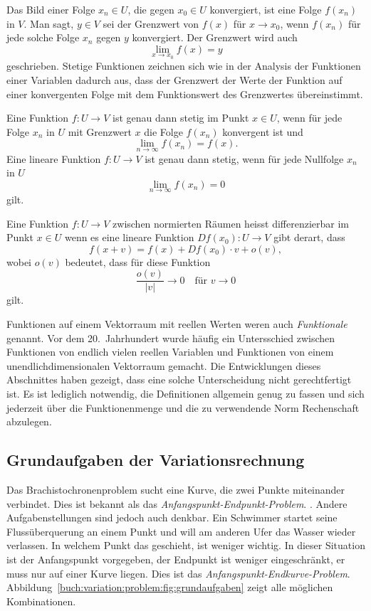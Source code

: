 Das Bild einer Folge $x_n\in U$, die gegen $x_0\in U$ konvergiert,
ist eine Folge $f(x_n)$ in $V$.
Man sagt, $y\in V$ sei der Grenzwert von $f(x)$ für $x\to x_0$,
wenn $f(x_n)$ für jede solche Folge $x_n$ gegen $y$ konvergiert.
Der Grenzwert wird auch
\[
\lim_{x\to x_0} f(x)
=
y
\]
geschrieben.
Stetige Funktionen zeichnen sich wie in der Analysis der Funktionen
einer Variablen dadurch aus, dass der Grenzwert der Werte der Funktion
auf einer konvergenten Folge mit dem Funktionswert des Grenzwertes
übereinstimmt.

\begin{satz}
Eine Funktion $f\colon U\to V$ ist genau dann stetig im Punkt $x\in U$,
wenn für jede Folge $x_n$ in $U$ mit Grenzwert $x$ die Folge $f(x_n)$
konvergent ist und
\[
\lim_{n\to\infty} f(x_n) = f(x).
\]
Eine lineare Funktion $f\colon U\to V$ ist genau dann stetig,
wenn für jede Nullfolge $x_n$ in $U$ 
\[
\lim_{n\to \infty} f(x_n) = 0
\]
gilt.
\end{satz}

\begin{definition}
Eine Funktion $f\colon U\to V$ zwischen normierten Räumen heisst
differenzierbar im Punkt $x\in U$ wenn es eine lineare Funktion
$Df(x_0)\colon U\to V$ gibt derart, dass
\[
f(x+v) =f(x) + Df(x_0)\cdot v + o(v),
\]
wobei $o(v)$ bedeutet, dass für diese Funktion
\[
\frac{o(v)}{|v|}\to 0
\quad\text{für $v\to 0$}
\]
gilt.
\end{definition}

Funktionen auf einem Vektorraum mit reellen Werten weren auch
{\em Funktionale} genannt.
Vor dem 20.~Jahrhundert wurde häufig ein Untersschied zwischen
Funktionen von endlich vielen reellen Variablen und Funktionen
von einem unendlichdimensionalen Vektorraum gemacht.
Die Entwicklungen dieses  Abschnittes haben gezeigt, dass eine
solche Unterscheidung nicht gerechtfertigt ist.
Es ist lediglich notwendig, die Definitionen allgemein genug zu
fassen und sich jederzeit über die Funktionenmenge und die zu
verwendende Norm Rechenschaft abzulegen.

%
%
\subsection{Grundaufgaben der Variationsrechnung}

Das Brachistochronenproblem sucht eine Kurve, die zwei Punkte miteinander
verbindet.
Dies ist bekannt als das {\em Anfangspunkt-Endpunkt-Problem}.
.
Andere Aufgabenstellungen sind jedoch auch denkbar.
Ein Schwimmer startet seine Flussüberquerung an einem Punkt
und will am anderen Ufer das Wasser wieder verlassen.
In welchem Punkt das geschieht, ist weniger wichtig.
In dieser Situation ist der Anfangspunkt vorgegeben, der Endpunkt ist
weniger eingeschränkt, er muss nur auf einer Kurve liegen.
Dies ist das {\em Anfangspunkt-Endkurve-Problem}.
Abbildung~\ref{buch:variation:problem:fig:grundaufgaben}
zeigt alle möglichen Kombinationen.

